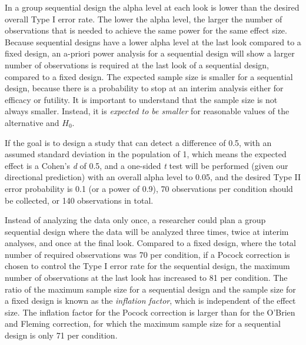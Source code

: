 \documentclass[
  english,
  ,jou, a4paper,floatsintext]{apa6}
\begin{document}
In a group sequential design the alpha level at each look is lower than the desired overall Type I error rate. The lower the alpha level, the larger the number of observations that is needed to achieve the same power for the same effect size. Because sequential designs have a lower alpha level at the last look compared to a fixed design, an a-priori power analysis for a sequential design will show a larger number of observations is required at the last look of a sequential design, compared to a fixed design. The expected sample size is smaller for a sequential design, because there is a probability to stop at an interim analysis either for efficacy or futility. It is important to understand that the sample size is not always smaller. Instead, it is \emph{expected to be smaller} for reasonable values of the alternative and \(H_0\).

If the goal is to design a study that can detect a difference of 0.5, with an assumed standard deviation in the population of 1, which means the expected effect is a Cohen's \emph{d} of 0.5, and a one-sided \emph{t} test will be performed (given our directional prediction) with an overall alpha level to 0.05, and the desired Type II error probability is 0.1 (or a power of 0.9), 70 observations per condition should be collected, or 140 observations in total.

Instead of analyzing the data only once, a researcher could plan a group sequential design where the data will be analyzed three times, twice at interim analyses, and once at the final look. Compared to a fixed design, where the total number of required observations was 70 per condition, if a Pocock correction is chosen to control the Type I error rate for the sequential design, the maximum number of observations at the last look has increased to 81 per condition. The ratio of the maximum sample size for a sequential design and the sample size for a fixed design is known as the \emph{inflation factor}, which is independent of the effect size. The inflation factor for the Pocock correction is larger than for the O'Brien and Fleming correction, for which the maximum sample size for a sequential design is only 71 per condition.
\end{document}
